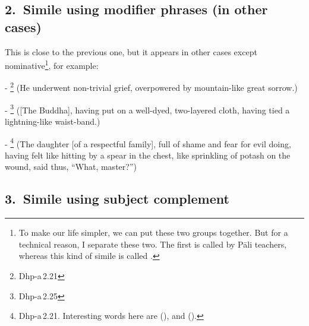 \subsection*{2.\ Simile using modifier phrases (in other cases)}

This is close to the previous one, but it appears in other cases except nominative\footnote{To make our life simpler, we can put these two groups together. But for a technical reason, I separate these two. The first is called  by P\=ali teachers, whereas this kind of simile is called .}, for example:\par
- \footnote{Dhp-a\,2.21} (He underwent non-trivial grief, overpowered by mountain-like great sorrow.)\par
- \footnote{Dhp-a\,2.25} ([The Buddha], having put on a well-dyed, two-layered cloth, having tied a lightning-like waist-band.)\par
- \footnote{Dhp-a\,2.21. Interesting words here are  (), and  ().} (The daughter [of a respectful family], full of shame and fear for evil doing, having felt like hitting by a spear in the chest, like sprinkling of potash on the wound, said thus, ``What, master?'')\par

\subsection*{3.\ Simile using subject complement}

